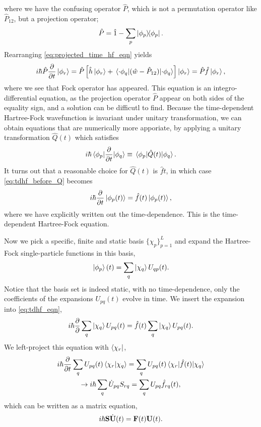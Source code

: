 where we have the confusing operator $\hat{P}$, which is not a permutation operator 
like $\hat{P}_{12}$, but a projection operator;
\begin{equation}
    \hat{P} = \hat{1} - \sum_p \outerproduct{\phi_p}.
\end{equation}
Rearranging \autoref{eq:projected_time_hf_eqn} yields
\begin{equation}
    \label{eq:tdhf_before_Q}
    i\hbar \hat{P}\frac{\partial}{\partial t} \ket{\phi_r} 
    = \hat{P}\left[\hat{h}\ket{\phi_r} 
        + \mel{\cdot\phi_q}{(\hat{w} - \hat{P}_{12})}{\cdot\phi_q} \right]\ket{\phi_r}
    = \hat{P}\hat{f}\ket{\phi_r},
\end{equation}
where we see that Fock operator has appeared. This equation is an integro-differential 
equation, as the projection operator $\hat{P}$ appear on both sides of the equality 
sign, and a solution can be difficutl to find. Because the time-dependent Hartree-Fock 
wavefunction is invariant under unitary transformation, we can obtain equations that are 
numerically more apporiate, by applying a unitary transformation $\hat{Q}(t)$ which 
satisfies
\begin{equation}
    i\hbar\mel{\phi_p}{\frac{\partial}{\partial t}}{\phi_q}
    \equiv \mel{\phi_p}{\hat{Q}(t)}{\phi_q}.
\end{equation}
It turns out that a reasonable choice for $\hat{Q}(t)$ is $\hat{f}{t}$, in which case 
\autoref{eq:tdhf_before_Q} becomes
\begin{equation}
    \label{eq:tdhf_eqn}
    i\hbar\frac{\partial}{\partial t}\ket{\phi_p(t)} = \hat{f}(t)\ket{\phi_p(t)},
\end{equation}
where we have explicitly written out the time-dependence. This is the time-dependent 
Hartree-Fock equation.

Now we pick a specific, finite and static basis $\{\chi_p\}_{p=1}^{L}$ and expand the Hartree-Fock single-particle
functions in this basis,
\begin{equation}
    \ket{\phi_p}(t) = \sum_q \ket{\chi_q} U_{qp}(t).
\end{equation}
Notice that the basis set is indeed static, with no time-dependence, only the coefficients 
of the expansions $U_{pq}(t)$ evolve in time.  
We insert the expansion into \autoref{eq:tdhf_eqn},
\begin{equation}
    i\hbar\frac{\partial}{\partial}\sum_q \ket{\chi_q}U_{pq}(t) = \hat{f}(t)\sum_q \ket{\chi_q} U_{pq}(t).
\end{equation}
We left-project this equation with $\bra{\chi_r}$,
\begin{equation}
    \begin{gathered}
    i\hbar\frac{\partial}{\partial t} \sum_q U_{pq}(t)\braket{\chi_r}{\chi_q}
        = \sum_q U_{pq}(t) \mel{\chi_r}{\hat{f}(t)}{\chi_q}  \\
    \to i\hbar \sum_q \dot{U}_{pq} S_{rq} = \sum_q U_{pq} \hat{f}_{rq}(t),
    \end{gathered}
\end{equation}
which can be written as a matrix equation,
\begin{equation}
    i\hbar \vb{S}\dot{\vb{U}}(t) = \vb{F}(t)\vb{U}(t).
\end{equation}
